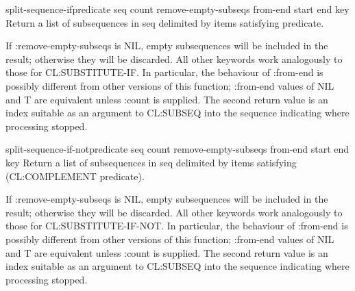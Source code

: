 \begin{function}{split-sequence-if}{predicate seq \key count
    remove-empty-subseqs from-end start end key}{}{}
Return a list of subsequences in seq delimited by items satisfying
predicate.

If :remove-empty-subseqs is NIL, empty subsequences will be included
in the result; otherwise they will be discarded.  All other keywords
work analogously to those for CL:SUBSTITUTE-IF.  In particular, the
behaviour of :from-end is possibly different from other versions of
this function; :from-end values of NIL and T are equivalent unless
:count is supplied. The second return value is an index suitable as an
argument to CL:SUBSEQ into the sequence indicating where processing
stopped.  
\end{function}

\begin{function}{split-sequence-if-not}{predicate seq \key count
    remove-empty-subseqs from-end start end key}{}{}
  Return a list of subsequences in seq delimited by items satisfying
  (CL:COMPLEMENT predicate).

  If :remove-empty-subseqs is NIL, empty subsequences will be included
  in the result; otherwise they will be discarded. All other keywords
  work analogously to those for CL:SUBSTITUTE-IF-NOT. In particular,
  the behaviour of :from-end is possibly different from other versions
  of this function; :from-end values of NIL and T are equivalent
  unless :count is supplied. The second return value is an index
  suitable as an argument to CL:SUBSEQ into the sequence indicating
  where processing stopped.
\end{function}
